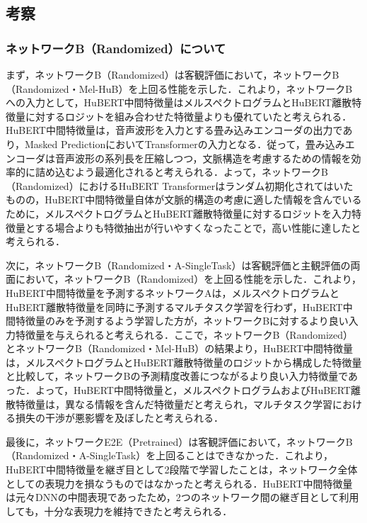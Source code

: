 \subsection{考察}
\subsubsection{ネットワークB（Randomized）について}
まず，ネットワークB（Randomized）は客観評価において，ネットワークB（Randomized・Mel-HuB）を上回る性能を示した．これより，ネットワークBへの入力として，HuBERT中間特徴量はメルスペクトログラムとHuBERT離散特徴量に対するロジットを組み合わせた特徴量よりも優れていたと考えられる．HuBERT中間特徴量は，音声波形を入力とする畳み込みエンコーダの出力であり，Masked PredictionにおいてTransformerの入力となる．従って，畳み込みエンコーダは音声波形の系列長を圧縮しつつ，文脈構造を考慮するための情報を効率的に詰め込むよう最適化されると考えられる．よって，ネットワークB（Randomized）におけるHuBERT Transformerはランダム初期化されてはいたものの，HuBERT中間特徴量自体が文脈的構造の考慮に適した情報を含んでいるために，メルスペクトログラムとHuBERT離散特徴量に対するロジットを入力特徴量とする場合よりも特徴抽出が行いやすくなったことで，高い性能に達したと考えられる．

次に，ネットワークB（Randomized・A-SingleTask）は客観評価と主観評価の両面において，ネットワークB（Randomized）を上回る性能を示した．これより，HuBERT中間特徴量を予測するネットワークAは，メルスペクトログラムとHuBERT離散特徴量を同時に予測するマルチタスク学習を行わず，HuBERT中間特徴量のみを予測するよう学習した方が，ネットワークBに対するより良い入力特徴量を与えられると考えられる．ここで，ネットワークB（Randomized）とネットワークB（Randomized・Mel-HuB）の結果より，HuBERT中間特徴量は，メルスペクトログラムとHuBERT離散特徴量のロジットから構成した特徴量と比較して，ネットワークBの予測精度改善につながるより良い入力特徴量であった．よって，HuBERT中間特徴量と，メルスペクトログラムおよびHuBERT離散特徴量は，異なる情報を含んだ特徴量だと考えられ，マルチタスク学習における損失の干渉が悪影響を及ぼしたと考えられる．

最後に，ネットワークE2E（Pretrained）は客観評価において，ネットワークB（Randomized・A-SingleTask）を上回ることはできなかった．これより，HuBERT中間特徴量を継ぎ目として2段階で学習したことは，ネットワーク全体としての表現力を損なうものではなかったと考えられる．HuBERT中間特徴量は元々DNNの中間表現であったため，2つのネットワーク間の継ぎ目として利用しても，十分な表現力を維持できたと考えられる．

